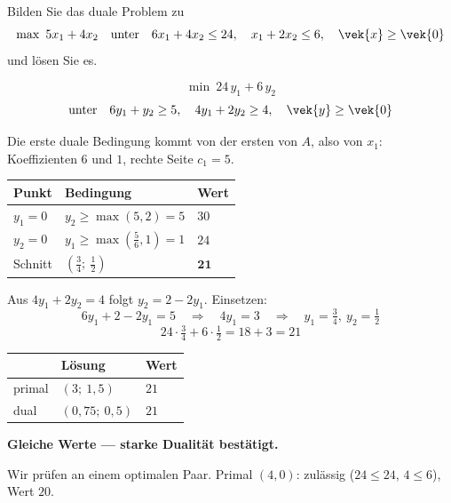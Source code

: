 \begin{aufgabe}
Bilden Sie das duale Problem zu
\[ \max\ 5x_1+4x_2 \quad\text{unter}\quad 6x_1+4x_2 \le 24,\quad x_1+2x_2 \le 6,\quad \vek{x}\ge\vek{0} \]
und lösen Sie es.

\loesung
{}
\[ \min\ 24\,y_1+6\,y_2 \]
\[ \text{unter}\quad 6y_1+y_2 \ge 5, \quad 4y_1+2y_2 \ge 4, \quad \vek{y}\ge\vek{0} \]

 Die erste duale Bedingung kommt von der ersten  von $A$, also von $x_1$: Koeffizienten $6$ und $1$, rechte Seite $c_1=5$. \checkmark

\begin{center}
{\small
\renewcommand{\arraystretch}{1.48}
\begin{tabular}{@{}P{2.4cm}P{2.8cm}P{2.2cm}@{}}
\toprule
\textbf{Punkt} & \textbf{Bedingung} & \textbf{Wert}\\
\midrule
$y_1=0$ & $y_2 \ge \max(5,2)=5$ & $30$\\
$y_2=0$ & $y_1 \ge \max(\tfrac56,1)=1$ & $24$\\
Schnitt & $(\tfrac34;\ \tfrac12)$ & $\mathbf{21}$\\
\bottomrule
\end{tabular}}
\end{center}

 Aus $4y_1+2y_2=4$ folgt $y_2 = 2-2y_1$. Einsetzen:
\[ 6y_1 + 2 - 2y_1 = 5 \quad\Longrightarrow\quad 4y_1 = 3 \quad\Longrightarrow\quad y_1 = \tfrac34,\ y_2 = \tfrac12 \]
\[ 24\cdot\tfrac34 + 6\cdot\tfrac12 = 18+3 = 21 \]

\begin{center}
\renewcommand{\arraystretch}{1.48}
\begin{tabular}{@{}P{2.4cm}P{2.6cm}P{2.4cm}@{}}
\toprule
& \textbf{Lösung} & \textbf{Wert}\\
\midrule
primal & $(3;\ 1{,}5)$ & $21$\\
dual & $(0{,}75;\ 0{,}5)$ & $21$\\
\bottomrule
\end{tabular}
\end{center}

\textbf{Gleiche Werte --- starke Dualität bestätigt.} \checkmark

Wir prüfen an einem  optimalen Paar. Primal $(4,0)$: zulässig ($24 \le 24$, $4 \le 6$), Wert $20$.


\end{aufgabe}
